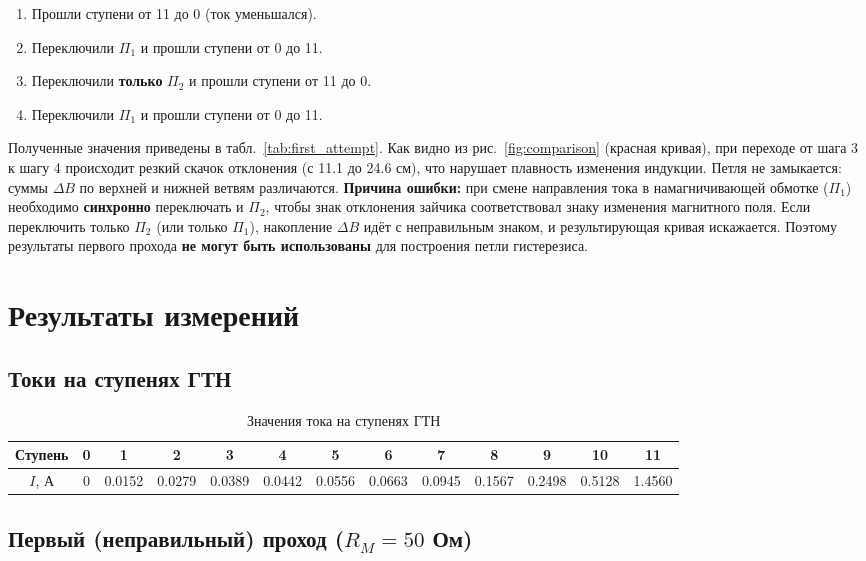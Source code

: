 \documentclass[a4paper]{article}
\begin{document}
\begin{enumerate}
	\item Прошли ступени от 11 до 0 (ток уменьшался).
	\item Переключили $\Pi_1$ и прошли ступени от 0 до 11.
	\item Переключили \textbf{только} $\Pi_2$ и прошли ступени от 11 до 0.
	\item Переключили $\Pi_1$ и прошли ступени от 0 до 11.
\end{enumerate}

Полученные значения приведены в табл.~\ref{tab:first_attempt}. Как видно из рис.~\ref{fig:comparison} (красная кривая), при переходе от шага 3 к шагу 4 происходит резкий скачок отклонения (с 11.1 до 24.6 см), что нарушает плавность изменения индукции. Петля не замыкается: суммы $\Delta B$ по верхней и нижней ветвям различаются. \textbf{Причина ошибки:} при смене направления тока в намагничивающей обмотке ($\Pi_1$) необходимо \textbf{синхронно} переключать и $\Pi_2$, чтобы знак отклонения зайчика соответствовал знаку изменения магнитного поля. Если переключить только $\Pi_2$ (или только $\Pi_1$), накопление $\Delta B$ идёт с неправильным знаком, и результирующая кривая искажается. Поэтому результаты первого прохода \textbf{не могут быть использованы} для построения петли гистерезиса.

\section{Результаты измерений}

\subsection{Токи на ступенях ГТН}

\begin{table}[h]
	\centering
	\caption{Значения тока на ступенях ГТН}
	\label{tab:currents}
	\begin{tabular}{|c|c|c|c|c|c|c|c|c|c|c|c|c|}
		\hline
		Ступень & 0 & 1 & 2 & 3 & 4 & 5 & 6 & 7 & 8 & 9 & 10 & 11 \\
		\hline
		$I$, А & 0 & 0.0152 & 0.0279 & 0.0389 & 0.0442 & 0.0556 & 0.0663 & 0.0945 & 0.1567 & 0.2498 & 0.5128 & 1.4560 \\
		\hline
	\end{tabular}
\end{table}

\subsection{Первый (неправильный) проход ($R_M = 50$ Ом)}
\end{document}
